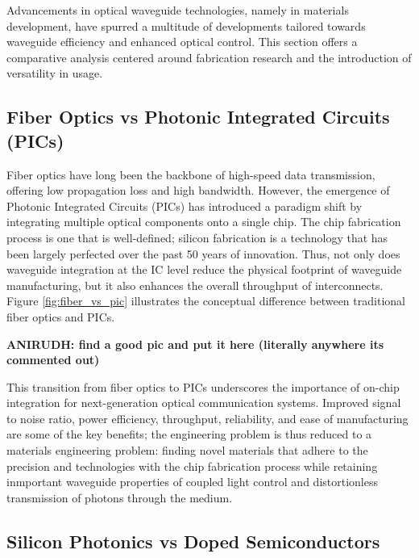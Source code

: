 \documentclass[10pt]{article}
\begin{document}
Advancements in optical waveguide technologies, namely in materials development, have spurred a multitude of developments tailored towards waveguide efficiency and enhanced optical control. This section offers a comparative analysis centered around fabrication research and the introduction of versatility in usage.

\subsection{Fiber Optics vs Photonic Integrated Circuits (PICs)}

Fiber optics have long been the backbone of high-speed data transmission, offering low propagation loss and high bandwidth. However, the emergence of Photonic Integrated Circuits (PICs) has introduced a paradigm shift by integrating multiple optical components onto a single chip. The chip fabrication process is one that is well-defined; silicon fabrication is a technology that has been largely perfected over the past 50 years of innovation. Thus, not only does waveguide integration at the IC level reduce the physical footprint of waveguide manufacturing, but it also enhances the overall throughput of interconnects. Figure \ref{fig:fiber_vs_pic} illustrates the conceptual difference between traditional fiber optics and PICs.

\textbf{ANIRUDH: find a good pic and put it here (literally anywhere its commented out)}

This transition from fiber optics to PICs underscores the importance of on-chip integration for next-generation optical communication systems. Improved signal to noise ratio, power efficiency, throughput, reliability, and ease of manufacturing are some of the key benefits; the engineering problem is thus reduced to a 
materials engineering problem: finding novel materials that adhere to the precision and technologies with the chip fabrication process while retaining inmportant waveguide 
properties of coupled light control and distortionless transmission of photons through the medium.

\subsection{Silicon Photonics vs Doped Semiconductors}
\end{document}

